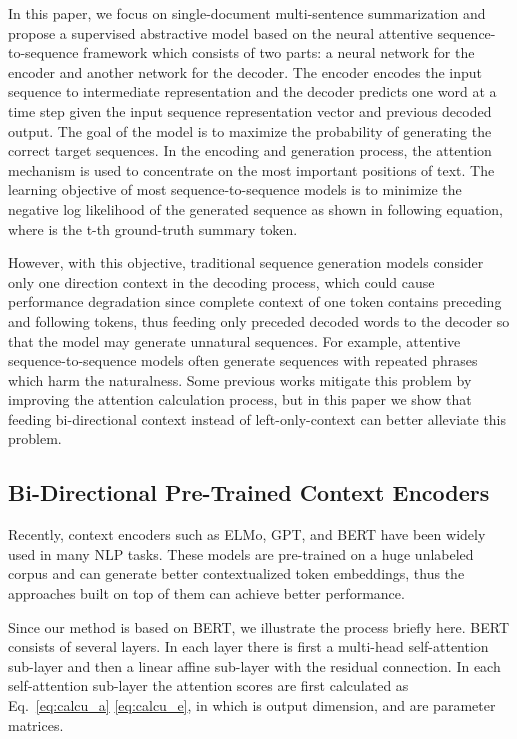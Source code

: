 \documentclass{article}
\begin{document}
In this paper, we focus on single-document multi-sentence summarization and propose a supervised abstractive model based on the neural attentive sequence-to-sequence framework which consists of two parts: a neural network for the encoder and another network for the decoder. The encoder encodes the input sequence to intermediate representation and the decoder predicts one word at a time step given the input sequence representation vector and previous decoded output. The goal of the model is to maximize the probability of generating the correct target sequences. In the encoding and generation process, the attention mechanism is used to concentrate on the most important positions of text. The learning objective of most sequence-to-sequence models is to minimize the negative log likelihood of the generated sequence as shown in following equation, where  is the t-th ground-truth summary token. 



However, with this objective, traditional sequence generation models consider only one direction context in the decoding process, which could cause performance degradation since complete context of one token contains preceding and following tokens, thus feeding only preceded decoded words to the decoder so that the model may generate unnatural sequences. For example, attentive sequence-to-sequence models often generate sequences with repeated phrases which harm the naturalness. Some previous works mitigate this problem by improving the attention calculation process, but in this paper we show that feeding bi-directional context instead of left-only-context can better alleviate this problem.

\subsection{Bi-Directional Pre-Trained Context Encoders}

Recently, context encoders such as ELMo, GPT, and BERT have been widely used in many NLP tasks. These models are pre-trained on a huge unlabeled corpus and can generate better contextualized token embeddings, thus the approaches built on top of them can achieve better performance. 

Since our method is based on BERT, we illustrate the process briefly here. BERT consists of several layers. In each layer there is first a multi-head self-attention sub-layer and then a linear affine sub-layer with the residual connection. In each self-attention sub-layer the attention scores  are first calculated as Eq.~\eqref{eq:calcu_a} \eqref{eq:calcu_e}, in which  is output dimension, and  are parameter matrices.
\end{document}
